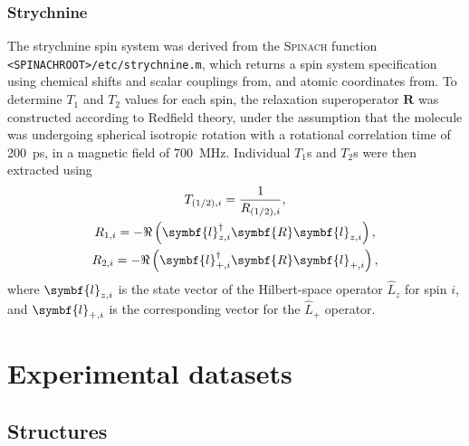 \subsubsection{Strychnine}
The strychnine spin system was derived from
the \textsc{Spinach} function \texttt{<SPINACHROOT>/etc/strychnine.m}, which returns a
spin system specification using chemical shifts and scalar couplings
from\cite[Appendix 5]{Berger2004}, and atomic coordinates
from\cite[Supplementary Material]{Butts2011}. To determine $T_1$ and  $T_2$
values for each spin, the relaxation superoperator $\symbf{R}$ was
constructed according to Redfield theory, under the assumption
that the molecule was undergoing spherical isotropic rotation with a rotational
correlation time of \qty{200}{\pico\second}, in a magnetic field of
\qty{700}{\mega\hertz}. Individual $T_1$s and $T_2$s were then extracted using
\begin{subequations}
    \begin{gather}
        T_{(1/2),i} = \frac{1}{R_{(1/2),i}}, \\
        R_{1,i} = - \Re \left(
            \symbf{l}_{z,i}^{\dagger} \symbf{R} \symbf{l}_{z,i}^{\vphantom{\dagger}}
            \right),\\
        R_{2,i} = - \Re \left(
            \symbf{l}_{+,i}^{\dagger} \symbf{R} \symbf{l}_{+,i}^{\vphantom{\dagger}}
            \right),
    \end{gather}
\end{subequations}
where $\symbf{l}_{z,i}^{\vphantom{\dagger}}$ is the state vector of the
Hilbert-space operator $\hat{L}_z$ for spin $i$, and
$\symbf{l}_{+,i}^{\vphantom{\dagger}}$ is the corresponding vector for the
$\hat{L}_+$ operator.




\section{Experimental datasets}

\subsection{Structures}

